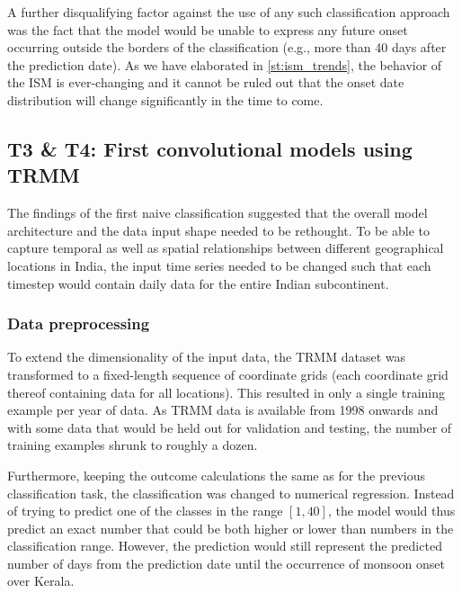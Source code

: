 A further disqualifying factor against the use of any such classification approach was the fact that the model would be unable to express any future onset occurring outside the borders of the classification (e.g., more than 40 days after the prediction date). As we have elaborated in \cref{st:ism_trends}, the behavior of the ISM is ever-changing and it cannot be ruled out that the onset date distribution will change significantly in the time to come.


\clearpage
\subsection{T3 \& T4: First convolutional models using TRMM}
\label{sst:nn_t3}
The findings of the first naive classification suggested that the overall model architecture and the data input shape needed to be rethought. To be able to capture temporal as well as spatial relationships between different geographical locations in India, the input time series needed to be changed such that each timestep would contain daily data for the entire Indian subcontinent.

\subsubsection{Data preprocessing}
\label{ssst:nn_t3_data}
To extend the dimensionality of the input data, the TRMM dataset was transformed to a fixed-length sequence of coordinate grids (each coordinate grid thereof containing data for all locations). This resulted in only a single training example per year of data. As TRMM data is available from 1998 onwards and with some data that would be held out for validation and testing, the number of training examples shrunk to roughly a dozen.

Furthermore, keeping the outcome calculations the same as for the previous classification task, the classification was changed to numerical regression. Instead of trying to predict one of the classes in the range $\left[ 1, 40 \right]$, the model would thus predict an exact number that could be both higher or lower than numbers in the classification range. However, the prediction would still represent the predicted number of days from the prediction date until the occurrence of monsoon onset over Kerala.

